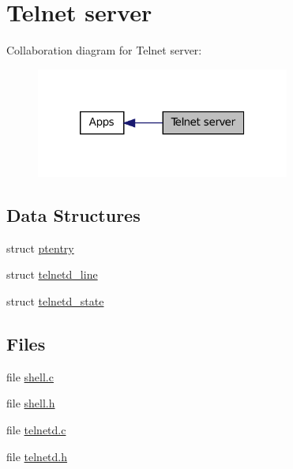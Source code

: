 \hypertarget{group__telnetd}{
\section{Telnet server}
\label{group__telnetd}
}


Collaboration diagram for Telnet server:
\nopagebreak
\begin{figure}[H]
\begin{center}
\leavevmode
\includegraphics[width=236pt]{group__telnetd}
\end{center}
\end{figure}


\subsection*{Data Structures}
\begin{DoxyCompactItemize}
\item 
struct \hyperlink{structptentry}{ptentry}
\item 
struct \hyperlink{structtelnetd__line}{telnetd\_\-line}
\item 
struct \hyperlink{structtelnetd__state}{telnetd\_\-state}
\end{DoxyCompactItemize}
\subsection*{Files}
\begin{DoxyCompactItemize}
\item 
file \hyperlink{shell_8c}{shell.c}
\item 
file \hyperlink{shell_8h}{shell.h}
\item 
file \hyperlink{telnetd_8c}{telnetd.c}
\item 
file \hyperlink{telnetd_8h}{telnetd.h}
\end{DoxyCompactItemize}
